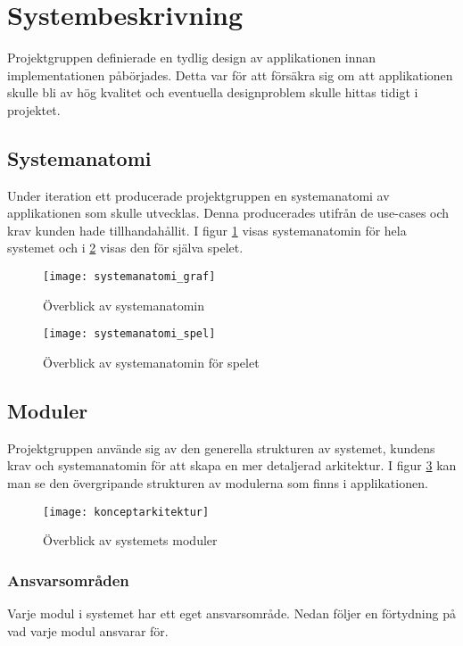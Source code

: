 \section{Systembeskrivning}

Projektgruppen definierade en tydlig design av applikationen innan implementationen påbörjades. Detta var för att försäkra sig om att applikationen skulle bli av hög kvalitet och eventuella designproblem skulle hittas tidigt i projektet.

\subsection{Systemanatomi}
\label{beskrivning-systemanatomi}
Under iteration ett producerade projektgruppen en systemanatomi av applikationen som skulle utvecklas. Denna producerades utifrån de use-cases och krav kunden hade tillhandahållit. I figur \ref{fig:systemanatomi_graf} visas systemanatomin för hela systemet och i \ref{fig:systemanatomi_spel} visas den för själva spelet.

\begin{figure}[H]
    \centering
    \texttt{[image: systemanatomi\_graf]}
    \caption{Överblick av systemanatomin}
    \label{fig:systemanatomi_graf}
\end{figure}

\begin{figure}[H]
    \centering
    \texttt{[image: systemanatomi\_spel]}
    \caption{Överblick av systemanatomin för spelet}
    \label{fig:systemanatomi_spel}
\end{figure}

\pagebreak

\subsection{Moduler}
\label{moduler}
Projektgruppen använde sig av den generella strukturen av systemet, kundens krav och systemanatomin för att skapa en mer detaljerad arkitektur. I figur \ref{fig:konceptarkitektur} kan man se den övergripande strukturen av modulerna som finns i applikationen.

\begin{figure}[h]
    \centering
    \texttt{[image: konceptarkitektur]}
    \caption{Överblick av systemets moduler}
    \label{fig:konceptarkitektur}
\end{figure}

\pagebreak

\subsubsection*{Ansvarsområden}
Varje modul i systemet har ett eget ansvarsområde. Nedan följer en förtydning på vad varje modul ansvarar för.

